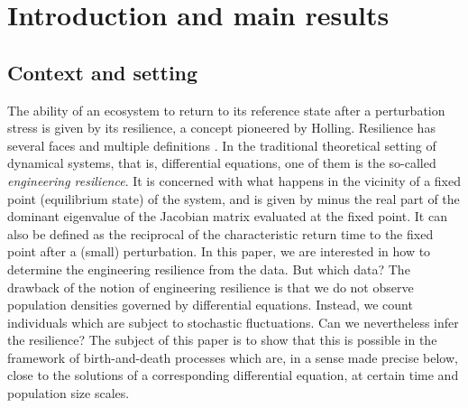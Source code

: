 \documentclass[11pt]{article}
\numberwithin{equation}{section}
\theoremstyle{plain}
\theoremstyle{definition}
\begin{document}
\section{Introduction and main results}\label{sec:intro}

\subsection{Context and setting}

The ability of an ecosystem to return to its reference state after a perturbation stress is given by its resilience, a concept
pioneered by Holling. Resilience has several faces and multiple definitions \cite{resilience-book}. In the traditional theoretical
setting of dynamical systems, that is, differential equations, one of them is the so-called {\em engineering resilience}. It
is concerned with what happens in the vicinity of a fixed point (equilibrium state) of the system, and is given by minus the real
part of the dominant eigenvalue of the Jacobian matrix evaluated at the fixed point. It can also be defined as the reciprocal of
the characteristic return time to the fixed point after a (small) perturbation.
In this paper, we are interested in how to determine the engineering resilience from the data. But which data?
The drawback of the notion of engineering resilience is that we do not observe population densities governed by differential equations.
Instead, we count individuals which are subject to stochastic fluctuations. Can we nevertheless infer the resilience? The subject of this
paper is to show that this is possible in the framework of birth-and-death processes which are, in a sense made precise below,
close to the solutions of a corresponding differential equation, at certain time and population size scales.
\end{document}
